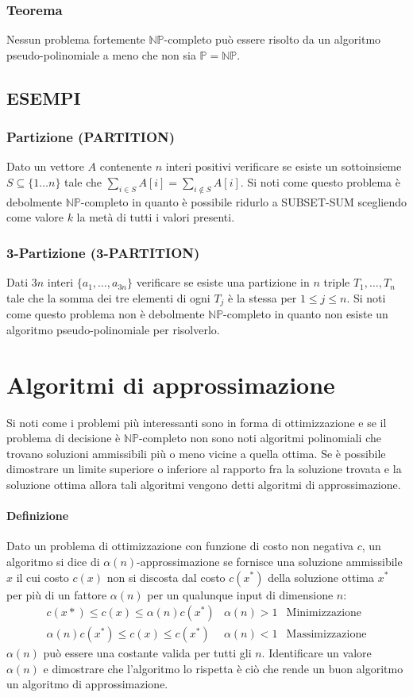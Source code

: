 \subsubsection{Teorema}
Nessun problema fortemente $\mathbb{NP}$-completo pu\`o essere risolto da un algoritmo pseudo-polinomiale a meno che non sia $\mathbb{P}=\mathbb{NP}$.
\subsection{ESEMPI}
\subsubsection{Partizione (PARTITION)}
Dato un vettore $A$ contenente $n$ interi positivi verificare se esiste un sottoinsieme $S\subseteq\{1\dots n\}$ tale che $\sum\limits_{i\in S}A[i] = \sum\limits_{i\not\in S}A[i]$. Si
noti come questo problema \`e debolmente $\mathbb{NP}$-completo in quanto \`e possibile ridurlo a SUBSET-SUM scegliendo come valore $k$ la met\`a di tutti i valori presenti.
\subsubsection{3-Partizione (3-PARTITION)}
Dati $3n$ interi $\{a_1, \dots, a_{3n}\}$ verificare se esiste una partizione in $n$ triple $T_1, \dots, T_n$ tale che la somma dei tre elementi di ogni $T_j$ \`e la stessa per $1\le j
\le n$. Si noti come questo problema non \`e debolmente $\mathbb{NP}$-completo in quanto non esiste un algoritmo pseudo-polinomiale per risolverlo.
\section{Algoritmi di approssimazione}
Si noti come i problemi pi\`u interessanti sono in forma di ottimizzazione e se il problema di decisione \`e $\mathbb{NP}$-completo non sono noti algoritmi polinomiali che trovano
soluzioni ammissibili pi\`u o meno vicine a quella ottima. Se \`e possibile dimostrare un limite superiore o inferiore al rapporto fra la soluzione trovata e la soluzione ottima allora
tali algoritmi vengono detti algoritmi di approssimazione. 
\paragraph{Definizione}
Dato un problema di ottimizzazione con funzione di costo non negativa $c$, un algoritmo si dice di $\alpha(n)$-approssimazione se fornisce una soluzione ammissibile $x$ il cui costo
$c(x)$ non si discosta dal costo $c(x^*)$ della soluzione ottima $x^*$ per pi\`u di un fattore $\alpha(n)$ per un qualunque input di dimensione $n$: 
\begin{align*}
	c(x*)\le c(x)\le\alpha(n)c(x^*) & \alpha(n)>1 & \text{Minimizzazione}\\
	\alpha(n)c(x^*)\le c(x)\le c(x^*) & \alpha(n)<1 & \text{Massimizzazione}
\end{align*}
$\alpha(n)$ pu\`o essere una costante valida per tutti gli $n$. Identificare un valore $\alpha(n)$ e dimostrare che l'algoritmo lo rispetta \`e ci\`o che rende un buon algoritmo un
algoritmo di approssimazione.
